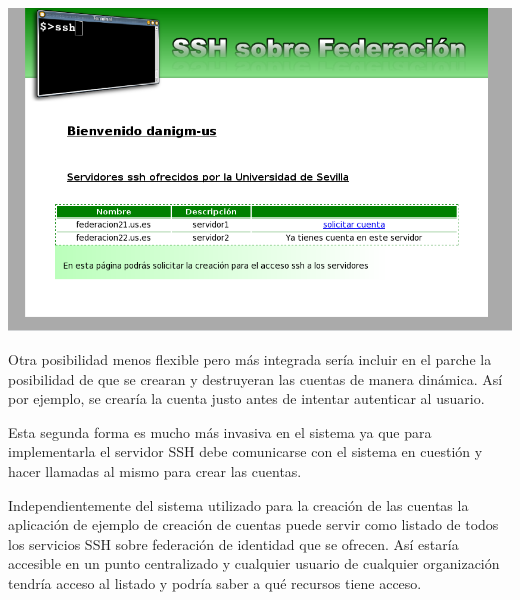     \begin{center}
        \includegraphics[width=\textwidth]{img/userAdd.png}
    \end{center}

    Otra posibilidad menos flexible pero más integrada sería incluir en
    el parche la posibilidad de que se crearan y destruyeran las cuentas
    de manera dinámica. Así por ejemplo, se crearía la cuenta justo antes
    de intentar autenticar al usuario.

    Esta segunda forma es mucho más invasiva en el sistema ya que para
    implementarla el servidor SSH debe comunicarse con el sistema en
    cuestión y hacer llamadas al mismo para crear las cuentas.

    Independientemente del sistema utilizado para la creación de las
    cuentas la aplicación de ejemplo de creación de cuentas puede servir
    como listado de todos los servicios SSH sobre federación de identidad
    que se ofrecen. Así estaría accesible en un punto centralizado y
    cualquier usuario de cualquier organización tendría acceso al listado y
    podría saber a qué recursos tiene acceso.
